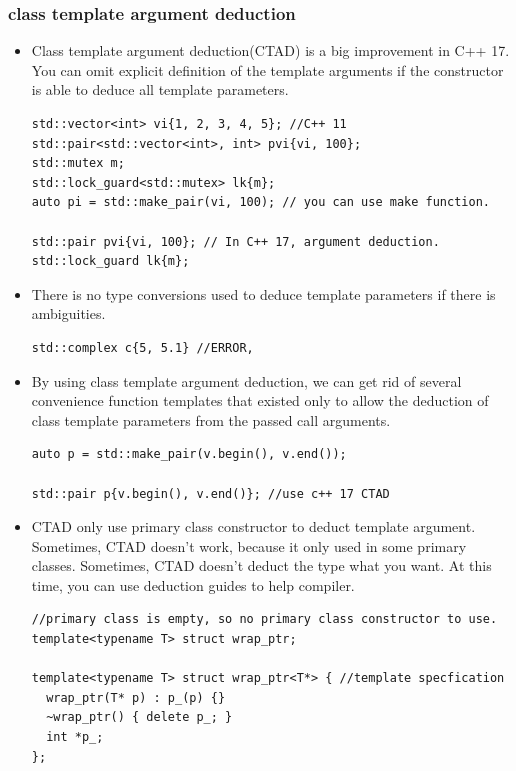 \documentclass[a4paper,11pt,twoside]{book}
\begin{document}
\subsubsection{class template argument deduction}
\begin{itemize}

	\item Class template argument deduction(CTAD) is a big improvement in C++ 17. You can omit explicit definition of the template arguments if the constructor is able to deduce all template parameters. 

\begin{lstlisting}
std::vector<int> vi{1, 2, 3, 4, 5}; //C++ 11
std::pair<std::vector<int>, int> pvi{vi, 100};
std::mutex m;
std::lock_guard<std::mutex> lk{m};
auto pi = std::make_pair(vi, 100); // you can use make function.

std::pair pvi{vi, 100}; // In C++ 17, argument deduction.
std::lock_guard lk{m};
\end{lstlisting}

	\item There is no type conversions used to deduce template parameters if there is ambiguities. 
\begin{lstlisting}
std::complex c{5, 5.1} //ERROR, 
\end{lstlisting}

    \item By using class template argument deduction, we can get rid of several convenience function templates that existed only to allow the deduction of class template parameters from the passed call arguments. 
\begin{lstlisting}
auto p = std::make_pair(v.begin(), v.end());

std::pair p{v.begin(), v.end()}; //use c++ 17 CTAD
\end{lstlisting}

    \item CTAD only use primary class constructor to deduct template argument. Sometimes, CTAD doesn't work, because it only used in some primary classes. Sometimes, CTAD doesn't deduct the type what you want. At this time, you can use deduction guides to help compiler.
\begin{lstlisting}
//primary class is empty, so no primary class constructor to use.
template<typename T> struct wrap_ptr; 

template<typename T> struct wrap_ptr<T*> { //template specfication
  wrap_ptr(T* p) : p_(p) {}
  ~wrap_ptr() { delete p_; }
  int *p_;
};


\end{lstlisting}
\end{itemize}
\end{document}
